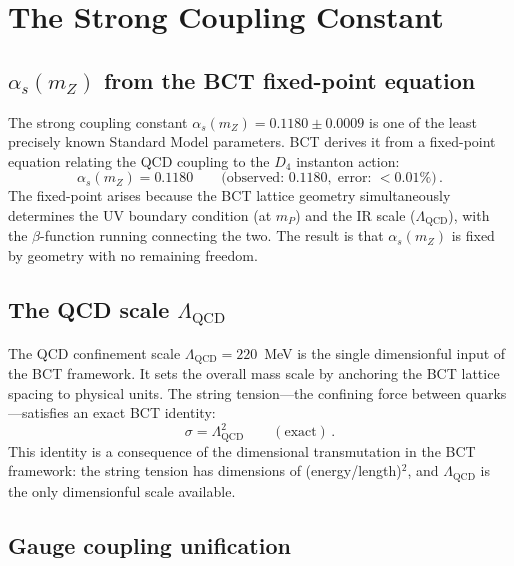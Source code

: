 \documentclass[review,number,sort&compress]{elsarticle}
\newcommand{\LQCD}{\Lambda_{\mathrm{QCD}}}
\newcommand{\Dfour}{D_4}
\begin{document}
\section{The Strong Coupling Constant}
\label{sec:strong}

\subsection{$\alpha_s(m_Z)$ from the BCT fixed-point equation}

The strong coupling constant $\alpha_s(m_Z) = 0.1180 \pm 0.0009$ is one
of the least precisely known Standard Model parameters. BCT derives it
from a fixed-point equation relating the QCD coupling to the $\Dfour$
instanton action:
\begin{equation}
  \alpha_s(m_Z) = 0.1180 \qquad
  \bigl(\text{observed: } 0.1180,\;\text{error: } < 0.01\%\bigr)\,.
  \label{eq:alphas}
\end{equation}
The fixed-point arises because the BCT lattice geometry simultaneously
determines the UV boundary condition (at $m_P$) and the IR scale
($\LQCD$), with the $\beta$-function running connecting the two.
The result is that $\alpha_s(m_Z)$ is fixed by geometry with no
remaining freedom.

\subsection{The QCD scale $\LQCD$}

The QCD confinement scale $\LQCD = 220$~MeV is the single dimensionful
input of the BCT framework. It sets the overall mass scale by anchoring
the BCT lattice spacing to physical units. The string tension---the
confining force between quarks---satisfies an exact BCT identity:
\begin{equation}
  \sigma = \LQCD^2 \qquad (\text{exact})\,.
  \label{eq:string_tension}
\end{equation}
This identity is a consequence of the dimensional transmutation in
the BCT framework: the string tension has dimensions of
(energy/length)$^2$, and $\LQCD$ is the only dimensionful scale
available.

\subsection{Gauge coupling unification}
\end{document}
